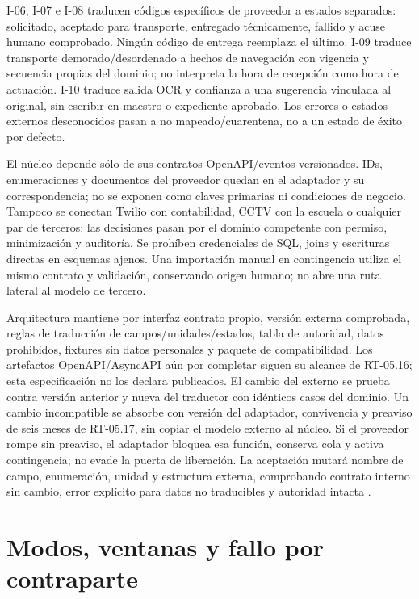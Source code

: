 I-06, I-07 e I-08 traducen códigos específicos de proveedor a estados separados: solicitado, aceptado para transporte, entregado técnicamente, fallido y acuse humano comprobado. Ningún código de entrega reemplaza el último. I-09 traduce transporte demorado/desordenado a hechos de navegación con vigencia y secuencia propias del dominio; no interpreta la hora de recepción como hora de actuación. I-10 traduce salida OCR y confianza a una sugerencia vinculada al original, sin escribir en maestro o expediente aprobado. Los errores o estados externos desconocidos pasan a no mapeado/cuarentena, no a un estado de éxito por defecto.

El núcleo depende sólo de sus contratos OpenAPI/eventos versionados. IDs, enumeraciones y documentos del proveedor quedan en el adaptador y su correspondencia; no se exponen como claves primarias ni condiciones de negocio. Tampoco se conectan Twilio con contabilidad, CCTV con la escuela o cualquier par de terceros: las decisiones pasan por el dominio competente con permiso, minimización y auditoría. Se prohíben credenciales de SQL, joins y escrituras directas en esquemas ajenos. Una importación manual en contingencia utiliza el mismo contrato y validación, conservando origen humano; no abre una ruta lateral al modelo de tercero.

Arquitectura mantiene por interfaz contrato propio, versión externa comprobada, reglas de traducción de campos/unidades/estados, tabla de autoridad, datos prohibidos, fixtures sin datos personales y paquete de compatibilidad. Los artefactos OpenAPI/AsyncAPI aún por completar siguen su alcance de RT-05.16; esta especificación no los declara publicados. El cambio del externo se prueba contra versión anterior y nueva del traductor con idénticos casos del dominio. Un cambio incompatible se absorbe con versión del adaptador, convivencia y preaviso de seis meses de RT-05.17, sin copiar el modelo externo al núcleo. Si el proveedor rompe sin preaviso, el adaptador bloquea esa función, conserva cola y activa contingencia; no evade la puerta de liberación. La aceptación mutará nombre de campo, enumeración, unidad y estructura externa, comprobando contrato interno sin cambio, error explícito para datos no traducibles y autoridad intacta \parencite[RT-05.20, p.~13]{pucv-transversal}.

\section*{Modos, ventanas y fallo por contraparte}
\label{sec:a42-ventanas}

